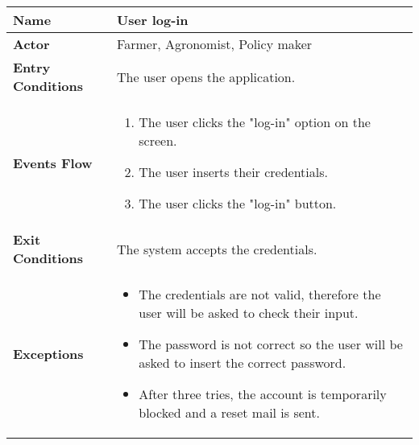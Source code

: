 
\begin{center}
\renewcommand{\arraystretch}{1.25}
\begin{tabular}{|l|>{\raggedright\arraybackslash}m{12cm}|}
    \hline
    \textbf{Name} & User log-in\\
    \hline
   	\textbf{Actor} & Farmer, Agronomist, Policy maker\\
    \hline
    \textbf{Entry Conditions} & The user opens the application.\\
    \hline
    \textbf{Events Flow} & 
    \begin{enumerate}
            \item The user clicks the "log-in" option on the screen.
            \item The user inserts their credentials.
            \item The user clicks the "log-in" button.
     \end{enumerate}\\
    \hline
    \textbf{Exit Conditions} & The system accepts the credentials.\\
    \hline
    \textbf{Exceptions} & 
      \begin{itemize}
      	\item The credentials are not valid, therefore the user will be asked to check their input.
		\item The password is not correct so the user will be asked to insert the correct password. 			\item After three tries, the account is temporarily blocked and a reset mail is sent.
        \end{itemize}
     \\
    \hline
\end{tabular}
\end{center}
